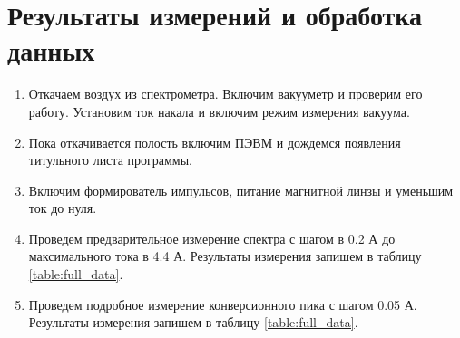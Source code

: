 \documentclass[a4paper,12pt]{article}
\begin{document}
\section{Результаты измерений и обработка данных}

\begin{enumerate}
    \item Откачаем воздух из спектрометра. Включим вакууметр и проверим его работу. Установим ток накала и включим режим измерения вакуума.
    \item Пока откачивается полость включим ПЭВМ и дождемся появления титульного листа программы.
    \item Включим формирователь импульсов, питание магнитной линзы и уменьшим ток до нуля.
    \item Проведем предварительное измерение спектра с шагом в 0.2 А до максимального тока в 4.4 А. Результаты измерения запишем в таблицу \ref{table:full_data}.
    \item Проведем подробное измерение конверсионного пика с шагом 0.05 А. Результаты измерения запишем в таблицу \ref{table:full_data}.
\end{enumerate}
\end{document}

